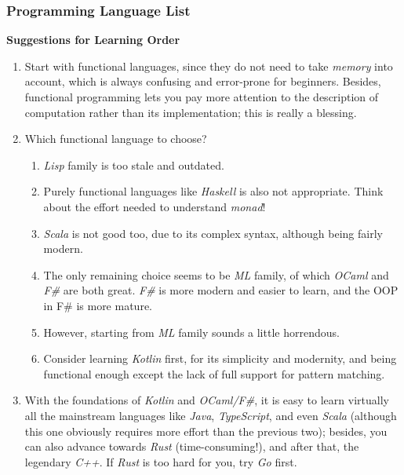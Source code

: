 \documentclass{article}
\begin{document}
\subsubsection{Programming Language List}

\textbf{Suggestions for Learning Order}

\begin{enumerate}
    \item Start with functional languages, since they do not need to take \emph{memory} into account, which is always confusing and error-prone for beginners.
    Besides, functional programming lets you pay more attention to the description of computation rather than its implementation; this is really a blessing.
    \item Which functional language to choose?
    \begin{enumerate}
        \item \emph{Lisp} family is too stale and outdated.
        \item Purely functional languages like \emph{Haskell} is also not appropriate.
        Think about the effort needed to understand \emph{monad}!
        \item \emph{Scala} is not good too, due to its complex syntax, although being fairly modern.
        \item The only remaining choice seems to be \emph{ML} family, of which \emph{OCaml} and \emph{F\#} are both great. \emph{F\#} is more modern and easier to learn, and the OOP in F\# is more mature.
        \item However, starting from \emph{ML} family sounds a little horrendous.
        \item Consider learning \emph{Kotlin} first, for its simplicity and modernity, and being functional enough except the lack of full support for pattern matching.
    \end{enumerate}
    \item With the foundations of \emph{Kotlin} and \emph{OCaml/F\#}, it is easy to learn virtually all the mainstream languages like \emph{Java}, \emph{TypeScript}, and even \emph{Scala} (although this one obviously requires more effort than the previous two); besides, you can also advance towards \emph{Rust} (time-consuming!), and after that, the legendary \emph{C++}.
    If \emph{Rust} is too hard for you, try \emph{Go} first.
\end{enumerate}
\end{document}
